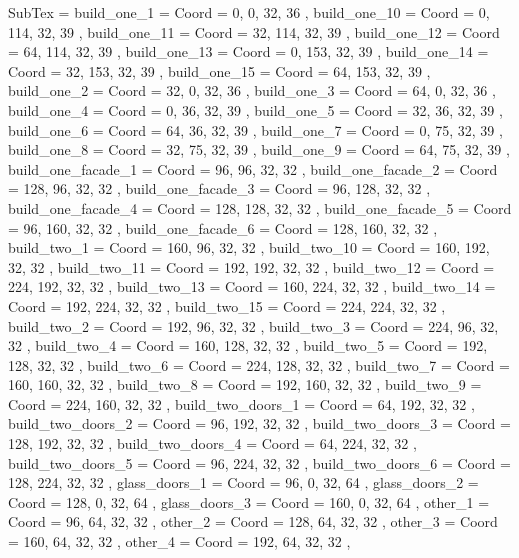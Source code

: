 SubTex = {
	build_one_1								= { Coord = { 0, 0, 32, 36 } },
	build_one_10								= { Coord = { 0, 114, 32, 39 } },
	build_one_11								= { Coord = { 32, 114, 32, 39 } },
	build_one_12								= { Coord = { 64, 114, 32, 39 } },
	build_one_13								= { Coord = { 0, 153, 32, 39 } },
	build_one_14								= { Coord = { 32, 153, 32, 39 } },
	build_one_15								= { Coord = { 64, 153, 32, 39 } },
	build_one_2								= { Coord = { 32, 0, 32, 36 } },
	build_one_3								= { Coord = { 64, 0, 32, 36 } },
	build_one_4								= { Coord = { 0, 36, 32, 39 } },
	build_one_5								= { Coord = { 32, 36, 32, 39 } },
	build_one_6								= { Coord = { 64, 36, 32, 39 } },
	build_one_7								= { Coord = { 0, 75, 32, 39 } },
	build_one_8								= { Coord = { 32, 75, 32, 39 } },
	build_one_9								= { Coord = { 64, 75, 32, 39 } },
	build_one_facade_1								= { Coord = { 96, 96, 32, 32 } },
	build_one_facade_2								= { Coord = { 128, 96, 32, 32 } },
	build_one_facade_3								= { Coord = { 96, 128, 32, 32 } },
	build_one_facade_4								= { Coord = { 128, 128, 32, 32 } },
	build_one_facade_5								= { Coord = { 96, 160, 32, 32 } },
	build_one_facade_6								= { Coord = { 128, 160, 32, 32 } },
	build_two_1								= { Coord = { 160, 96, 32, 32 } },
	build_two_10								= { Coord = { 160, 192, 32, 32 } },
	build_two_11								= { Coord = { 192, 192, 32, 32 } },
	build_two_12								= { Coord = { 224, 192, 32, 32 } },
	build_two_13								= { Coord = { 160, 224, 32, 32 } },
	build_two_14								= { Coord = { 192, 224, 32, 32 } },
	build_two_15								= { Coord = { 224, 224, 32, 32 } },
	build_two_2								= { Coord = { 192, 96, 32, 32 } },
	build_two_3								= { Coord = { 224, 96, 32, 32 } },
	build_two_4								= { Coord = { 160, 128, 32, 32 } },
	build_two_5								= { Coord = { 192, 128, 32, 32 } },
	build_two_6								= { Coord = { 224, 128, 32, 32 } },
	build_two_7								= { Coord = { 160, 160, 32, 32 } },
	build_two_8								= { Coord = { 192, 160, 32, 32 } },
	build_two_9								= { Coord = { 224, 160, 32, 32 } },
	build_two_doors_1								= { Coord = { 64, 192, 32, 32 } },
	build_two_doors_2								= { Coord = { 96, 192, 32, 32 } },
	build_two_doors_3								= { Coord = { 128, 192, 32, 32 } },
	build_two_doors_4								= { Coord = { 64, 224, 32, 32 } },
	build_two_doors_5								= { Coord = { 96, 224, 32, 32 } },
	build_two_doors_6								= { Coord = { 128, 224, 32, 32 } },
	glass_doors_1								= { Coord = { 96, 0, 32, 64 } },
	glass_doors_2								= { Coord = { 128, 0, 32, 64 } },
	glass_doors_3								= { Coord = { 160, 0, 32, 64 } },
	other_1								= { Coord = { 96, 64, 32, 32 } },
	other_2								= { Coord = { 128, 64, 32, 32 } },
	other_3								= { Coord = { 160, 64, 32, 32 } },
	other_4								= { Coord = { 192, 64, 32, 32 } },
}
